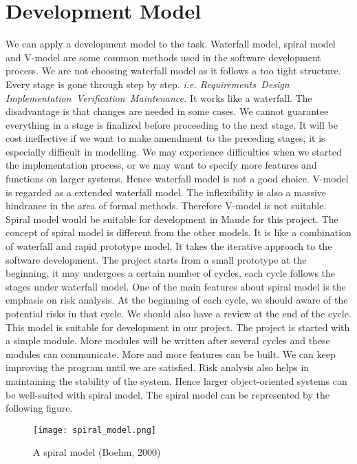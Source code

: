 \documentclass{report}
\begin{document}
\chapter{Development Model}
We can apply a development model to the task. Waterfall model, spiral model and V-model are some common methods used in the software development process. We are not choosing waterfall model as it follows a too tight structure. Every stage is gone through step by step. \textit{i.e. Requirements \rightarrow \,Design \rightarrow \,Implementation \rightarrow \,Verification \rightarrow \,Maintenance.} It works like a waterfall. The disadvantage is that changes are needed in some cases. We cannot guarantee everything in a stage is finalized before proceeding to the next stage. It will be cost ineffective if we want to make amendment to the preceding stages, it is especially difficult in modelling. We may experience difficulties when we started the implementation process, or we may want to specify more features and functions on larger systems. Hence waterfall model is not a good choice. V-model is regarded as a extended waterfall model. The inflexibility is also a massive hindrance in the area of formal methods. Therefore V-model is not suitable. 
\newline \newline Spiral model would be suitable for development in Maude for this project. The concept of spiral model is different from the other models. It is like a combination of waterfall and rapid prototype model. It takes the iterative approach to the software development. The project starts from a small prototype at the beginning, it may undergoes a certain number of cycles, each cycle follows the stages under waterfall model. One of the main features about spiral model is the emphasis on risk analysis. At the beginning of each cycle, we should aware of the potential risks in that cycle. We should also have a review at the end of the cycle. This model is suitable for development in our project. The project is started with a simple module. More modules will be written after several cycles and these modules can communicate. More and more features can be built. We can keep improving the program until we are satisfied. Risk analysis also helps in maintaining the stability of the system. 
Hence larger object-oriented systems can be well-suited with spiral model. The spiral model can be represented by the following figure.
\begin{figure}[h!]
  \centering
      \texttt{[image: spiral\_model.png]}
  \caption{A spiral model (Boehm, 2000)}
\end{figure}
\newline
\newline 
\end{document}
